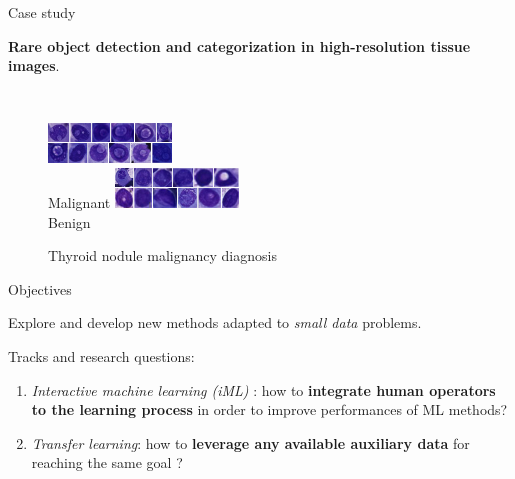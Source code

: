 \documentclass{beamer}
\begin{document}
\begin{frame}{Case study}
	\begin{center}
		\textbf{Rare object detection and categorization in high-resolution tissue images}.
	\end{center}
		
	\begin{figure}[h]
		\center
		\caption{Thyroid nodule malignancy diagnosis}
		 \\
		\begin{multicols}{2}
		\centering
		\includegraphics[height=40px]{thyroid/incl_centered.png}\\
		Malignant
		\includegraphics[height=40px]{thyroid/norm_centered.png}\\
		Benign
		\end{multicols}
	\end{figure}

	\vfill
\end{frame}


\begin{frame}{Objectives}
	\begin{center}
		\large
		Explore and develop new methods adapted to \textit{small data} problems.
	\end{center}
	
	\vfill
	Tracks and research questions: 
	\begin{enumerate}
		\item \textit{Interactive machine learning (iML)} : how to \textbf{integrate human operators to the learning process} in order to improve performances of ML methods?
		\item \textit{Transfer learning}: how to \textbf{leverage any available auxiliary data} for reaching the same goal ? 
	\end{enumerate}

\end{frame}
 
\end{document}
